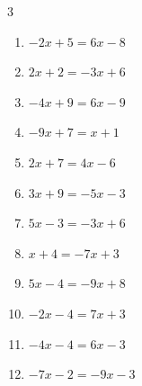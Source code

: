 


\setcounter{quesnum}{45}

\begin{multicols}{3}
\begin{enumerate}
  \itemsep=9pt
  \item $-2x+5=6x-8$


  \item $2x+2=-3x+6$


  \item $-4x+9=6x-9$


  \item $-9x+7=x+1$


  \item $2x+7=4x-6$


  \item $3x+9=-5x-3$


  \item $5x-3=-3x+6$


  \item $x+4=-7x+3$


  \item $5x-4=-9x+8$


  \item $-2x-4=7x+3$


  \item $-4x-4=6x-3$


  \item $-7x-2=-9x-3$



\end{enumerate}
\end{multicols}
